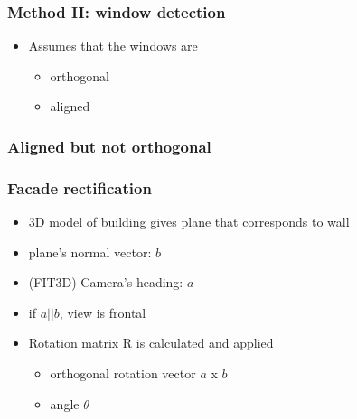 \documentclass{beamer}
\begin{document}
\frame
{
	\frametitle{Method II: window detection}
	\begin{itemize}
	\item <+-| alert@+> Assumes that the windows are
	\begin{itemize}
		\item <+-| alert@+> orthogonal
		\item <+-| alert@+> aligned
	\end{itemize}
	\end{itemize}

}

\frame
{
	\frametitle{Aligned but not orthogonal}
}

\frame
{
	\frametitle{Facade rectification}
	\begin{itemize}
		\item <+-| alert@+> 3D model of building gives plane that corresponds to wall
		\item <+-| alert@+> plane's normal vector:  $b$
		\item <+-| alert@+> (FIT3D) Camera's heading: $a$
		\item <+-| alert@+> if $a || b$, view is frontal
		\item <+-| alert@+> Rotation matrix R is calculated and applied
			\begin{itemize}
			\item <+-| alert@+> orthogonal rotation vector $a$ x $b$
			\item <+-| alert@+> angle $\theta$
			\end{itemize}
	\end{itemize}
}
\end{document}
